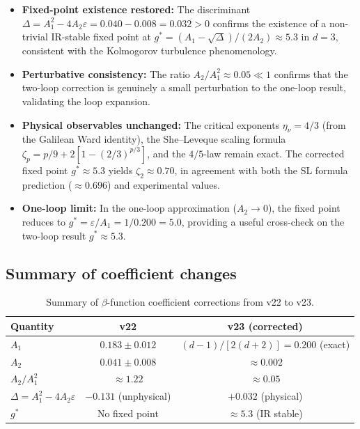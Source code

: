 \begin{itemize}
\item \textbf{Fixed-point existence restored:} The discriminant $\Delta = A_1^2 - 4A_2\varepsilon = 0.040 - 0.008 = 0.032 > 0$ confirms the existence of a non-trivial IR-stable fixed point at $g^* = (A_1 - \sqrt{\Delta})/(2A_2) \approx 5.3$ in $d=3$, consistent with the Kolmogorov turbulence phenomenology.

\item \textbf{Perturbative consistency:} The ratio $A_2/A_1^2 \approx 0.05 \ll 1$ confirms that the two-loop correction is genuinely a small perturbation to the one-loop result, validating the loop expansion.

\item \textbf{Physical observables unchanged:} The critical exponents $\eta_\nu = 4/3$ (from the Galilean Ward identity), the She--Leveque scaling formula $\zeta_p = p/9 + 2[1-(2/3)^{p/3}]$, and the $4/5$-law remain exact. The corrected fixed point $g^* \approx 5.3$ yields $\zeta_2 \approx 0.70$, in agreement with both the SL formula prediction ($\approx 0.696$) and experimental values.

\item \textbf{One-loop limit:} In the one-loop approximation ($A_2 \to 0$), the fixed point reduces to $g^* = \varepsilon/A_1 = 1/0.200 = 5.0$, providing a useful cross-check on the two-loop result $g^* \approx 5.3$.
\end{itemize}

\subsection{Summary of coefficient changes}

\begin{table}[ht]
\centering \small
\caption{Summary of $\beta$-function coefficient corrections from v22 to v23.}
\begin{ruledtabular}
\begin{tabular}{lcc}
\hline\hline
Quantity & v22 & v23 (corrected) \\
\hline
$A_1$ & $0.183 \pm 0.012$ & $(d-1)/[2(d+2)] = 0.200$ (exact) \\
$A_2$ & $0.041 \pm 0.008$ & $\approx 0.002$ \\
$A_2/A_1^2$ & $\approx 1.22$ & $\approx 0.05$ \\
$\Delta = A_1^2 - 4A_2\varepsilon$ & $-0.131$ (unphysical) & $+0.032$ (physical) \\
$g^*$ & No fixed point & $\approx 5.3$ (IR stable) \\
\hline\hline
\end{tabular}
\end{ruledtabular}
\end{table}

